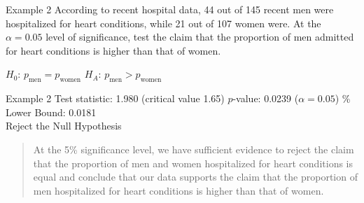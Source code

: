 \documentclass[t]{beamer}
\begin{document}
\begin{frame}{Example 2}
According to recent hospital data, 44 out of 145 recent men were hospitalized for heart conditions, while 21 out of 107 women were. At the $\alpha = 0.05$ level of significance, test the claim that the proportion of men admitted for heart conditions is higher than that of women.	\newline\\	\pause

$H_0: \, p_{\text{men}} = p_{\text{women}}$ \newline \pause
$H_A: \, p_{\text{men}} > p_{\text{women}}$
\end{frame}

\begin{frame}{Example 2}
Test statistic: 1.980 (critical value 1.65) \newline \pause
$p$-value: 0.0239 ($\alpha = 0.05$)	\newline {}\% Lower Bound: 0.0181	\newline\\	\pause
Reject the Null Hypothesis	\newline\\	\pause
\begin{quote}
At the 5\% significance level, we have sufficient evidence to reject the claim that the proportion of men and women hospitalized for heart conditions is equal and conclude that our data supports the claim that the proportion of men hospitalized for heart conditions is higher than that of women.
\end{quote}
\end{frame}
\end{document}
